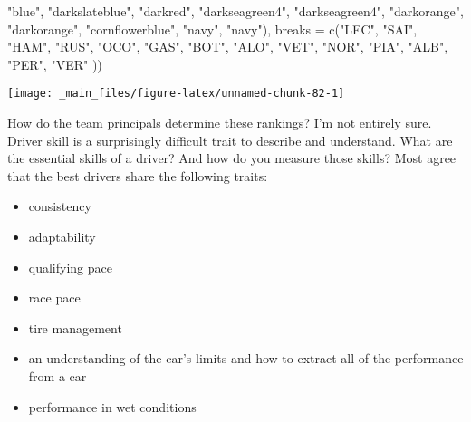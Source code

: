 \documentclass[
]{book}
\newenvironment{Shaded}{\begin{snugshade}}{\end{snugshade}}
\newcommand{\AttributeTok}[1]{\textcolor[rgb]{0.77,0.63,0.00}{#1}}
\newcommand{\FunctionTok}[1]{\textcolor[rgb]{0.00,0.00,0.00}{#1}}
\newcommand{\NormalTok}[1]{#1}
\newcommand{\StringTok}[1]{\textcolor[rgb]{0.31,0.60,0.02}{#1}}
\providecommand{\tightlist}{%
  \setlength{\itemsep}{0pt}\setlength{\parskip}{0pt}}
\begin{document}
\begin{Shaded}
\begin{Highlighting}[]
                                \StringTok{"blue"}\NormalTok{,}
                                \StringTok{"darkslateblue"}\NormalTok{,}
                                \StringTok{"darkred"}\NormalTok{,}
                                \StringTok{"darkseagreen4"}\NormalTok{, }\StringTok{"darkseagreen4"}\NormalTok{,}
                                \StringTok{"darkorange"}\NormalTok{, }\StringTok{"darkorange"}\NormalTok{,}
                                \StringTok{"cornflowerblue"}\NormalTok{, }
                                \StringTok{"navy"}\NormalTok{, }\StringTok{"navy"}\NormalTok{),}
                     \AttributeTok{breaks =} \FunctionTok{c}\NormalTok{(}\StringTok{"LEC"}\NormalTok{, }\StringTok{"SAI"}\NormalTok{,}
                                \StringTok{"HAM"}\NormalTok{, }\StringTok{"RUS"}\NormalTok{, }
                                \StringTok{"OCO"}\NormalTok{, }
                                \StringTok{"GAS"}\NormalTok{,  }
                                \StringTok{"BOT"}\NormalTok{,}
                                \StringTok{"ALO"}\NormalTok{, }\StringTok{"VET"}\NormalTok{,}
                                \StringTok{"NOR"}\NormalTok{, }\StringTok{"PIA"}\NormalTok{,}
                                \StringTok{"ALB"}\NormalTok{,}
                                \StringTok{"PER"}\NormalTok{, }\StringTok{"VER"}
\NormalTok{                                ))}
\end{Highlighting}
\end{Shaded}

\begin{center}\texttt{[image: \_main\_files/figure-latex/unnamed-chunk-82-1]} \end{center}

How do the team principals determine these rankings? I'm not entirely sure. Driver skill is a surprisingly difficult trait to describe and understand. What are the essential skills of a driver? And how do you measure those skills? Most agree that the best drivers share the following traits:

\begin{itemize}
\tightlist
\item
  consistency
\item
  adaptability
\item
  qualifying pace
\item
  race pace
\item
  tire management
\item
  an understanding of the car's limits and how to extract all of the performance from a car
\item
  performance in wet conditions
\end{itemize}
\end{document}
